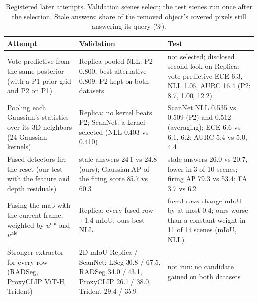 \documentclass[journal]{IEEEtran}
\begin{document}
\begin{table}[t]
\centering
\caption{Registered later attempts. Validation scenes select; the test scenes run once after the selection. Stale answers: share of the removed object's covered pixels still answering its query (\%).}
\label{tab:attempts}
\footnotesize
\setlength{\tabcolsep}{3pt}
\begin{tabular}{@{}p{}p{}p{}@{}}
\toprule
Attempt & Validation & Test\\
\midrule
Vote predictive from the same posterior (with a P1 prior grid and P2 on P1) & Replica pooled NLL: P2 0.800, best alternative 0.809; P2 kept on both datasets & not selected; disclosed second look on Replica: vote predictive ECE 6.3, NLL 1.06, AURC 16.4 (P2: 8.7, 1.00, 12.2)\\
Pooling each Gaussian's statistics over its 3D neighbors (24 Gaussian kernels) & Replica: no kernel beats P2; ScanNet: a kernel selected (NLL 0.403 vs 0.410) & ScanNet NLL 0.535 vs 0.509 (P2) and 0.512 (averaging); ECE 6.6 vs 6.1, 6.2; AURC 5.4 vs 5.0, 4.4\\
Fused detectors fire the reset (our test with the feature and depth residuals) & stale answers 24.1 vs 24.8 (ours); Gaussian AP of the firing score 85.7 vs 60.3 & stale answers 26.0 vs 20.7, lower in 3 of 10 scenes; firing AP 79.3 vs 53.4; FA 3.7 vs 6.2\\
Fusing the map with the current frame, weighted by $u^{\mathrm{epi}}$ and $u^{\mathrm{ale}}$ & Replica: every fused row +1.4 mIoU; ours best NLL & fused rows change mIoU by at most 0.4; ours worse than a constant weight in 11 of 14 scenes (mIoU, NLL)\\
Stronger extractor for every row (RADSeg, ProxyCLIP ViT-H, Trident) & 2D mIoU Replica / ScanNet: LSeg 30.8 / 67.5, RADSeg 34.0 / 43.1, ProxyCLIP 26.1 / 38.0, Trident 29.4 / 35.9 & not run: no candidate gained on both datasets\\
\bottomrule
\end{tabular}
\end{table}

\clearpage   %


\end{document}
